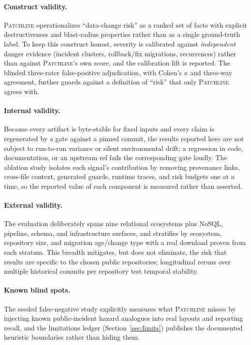 \documentclass[11pt]{article}
\newcommand{\tool}{\textsc{Patchline}}
\begin{document}
\paragraph{Construct validity.} \tool{} operationalizes ``data-change risk'' as a ranked set of facts
with explicit destructiveness and blast-radius properties rather than as a single ground-truth label.
To keep this construct honest, severity is calibrated against \emph{independent} danger evidence
(incident clusters, rollback/fix migrations, recurrences) rather than against \tool's own score, and
the calibration lift is reported. The blinded three-rater false-positive adjudication, with Cohen's
$\kappa$ and three-way agreement, further guards against a definition of ``risk'' that only \tool{}
agrees with.

\paragraph{Internal validity.} Because every artifact is byte-stable for fixed inputs and every claim
is regenerated by a gate against a pinned commit, the results reported here are not subject to
run-to-run variance or silent environmental drift; a regression in code, documentation, or an upstream
ref fails the corresponding gate loudly. The ablation study isolates each signal's contribution by
removing provenance links, cross-file context, generated guards, runtime traces, and risk budgets one
at a time, so the reported value of each component is measured rather than asserted.

\paragraph{External validity.} The evaluation deliberately spans nine relational ecosystems plus
NoSQL, pipeline, schema, and infrastructure surfaces, and stratifies by ecosystem, repository size,
and migration age/change type with a real download proven from each stratum. This breadth mitigates,
but does not eliminate, the risk that results are specific to the chosen public repositories;
longitudinal reruns over multiple historical commits per repository test temporal stability.

\paragraph{Known blind spots.} The seeded false-negative study explicitly measures what \tool{} misses
by injecting known public-incident hazard analogues into real layouts and reporting recall, and the
limitations ledger (Section~\ref{sec:limits}) publishes the documented heuristic boundaries rather
than hiding them.
\end{document}
